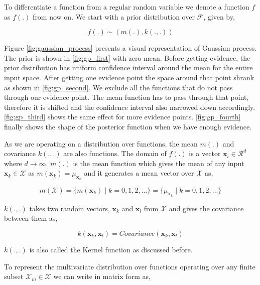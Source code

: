 \documentclass[english]{tktltiki}
\begin{document}
To differentiate a function from a regular random variable we denote a function $f$ as $f(.)$ from now on. We start with a prior distribution over $\mathcal{F}$, given by,

\begin{equation}
f(.) \sim (m(.), k(.,.))
\end{equation}

Figure \ref{fig:gaussian_process} presents a visual representation of Gaussian process. The prior is shown in \ref{fig:gp_first} with zero mean. Before getting evidence, the prior distribution has uniform confidence interval around the mean for the entire input space. After getting one evidence point the space around that point shrank as shown in \ref{fig:gp_second}. We exclude all the functions that do not pass through our evidence point. The mean function has to pass through that point, therefore it is shifted and the confidence interval also narrowed down accordingly. \ref{fig:gp_third} shows the same effect for more evidence points. \ref{fig:gp_fourth} finally shows the shape of the posterior function when we have enough evidence.

As we are operating on a distribution over functions, the mean $m(.)$ and covariance $k(.,.)$ are also functions. The domain of $f(.)$ is a vector $\mathbf{x}_i \in \mathcal{R}^d$ where $d \to \infty$. $m(.)$ is the mean function which gives the mean of any input $\mathbf{x}_k \in \mathcal{X}$ as $m(\mathbf{x}_k) = \mu_{\mathbf{x}_k}$ and it generates a mean vector over $\mathcal{X}$ as,

$$
m(\mathcal{X}) = \{m(\mathbf{x}_k) \mid k = 0, 1, 2, ...\} = \{\mu_{\mathbf{x}_k} \mid k = 0, 1, 2, ...\} 
$$

$k(.,.)$ takes two random vectors, $\mathbf{x}_k$ and $\mathbf{x}_l$ from $\mathcal{X}$ and gives the covariance between them as,

$$
k(\mathbf{x}_k, \mathbf{x}_l) = Covariance(\mathbf{x}_k, \mathbf{x}_l)
$$

$k(.,.)$ is also called the Kernel function as discussed before.

To represent the multivariate distribution over functions operating over any finite subset $\mathcal{X}_m \in \mathcal{X}$ we can write in matrix form as,
\end{document}
